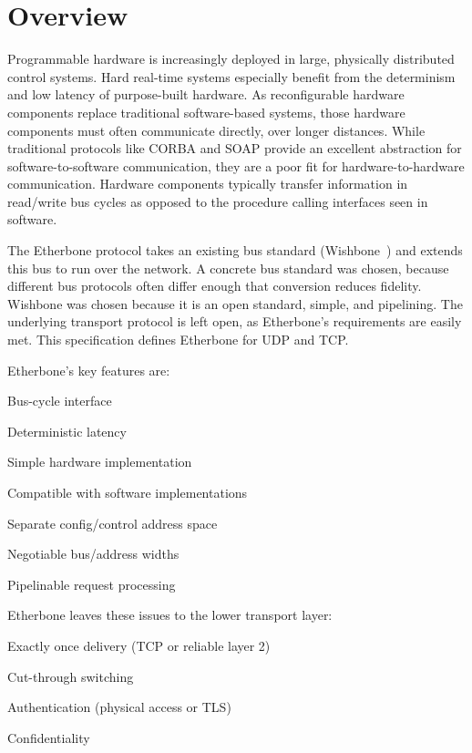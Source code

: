\documentclass{article}
\newenvironment{packed_itemize}{
\begin{itemize}
  \setlength{\itemsep}{1pt}
  \setlength{\parskip}{0pt}
  \setlength{\parsep}{0pt}
}{\end{itemize}}
\begin{document}

\section{Overview}

Programmable hardware is increasingly deployed in large, physically distributed control systems.
Hard real-time systems especially benefit from the determinism and low latency of purpose-built hardware.
As reconfigurable hardware components replace traditional software-based systems, 
those hardware components must often communicate directly, over longer distances.
While traditional protocols like CORBA and SOAP 
provide an excellent abstraction for software-to-software communication,
they are a poor fit for hardware-to-hardware communication.
Hardware components typically transfer information in read/write bus cycles
as opposed to the procedure calling interfaces seen in software.

The Etherbone protocol takes an existing bus standard (Wishbone~\cite{wishbone}) 
and extends this bus to run over the network.
A concrete bus standard was chosen, 
because different bus protocols often differ enough that conversion reduces fidelity.
Wishbone was chosen because it is an open standard, simple, and pipe\-lining.
The underlying transport protocol is left open,
as Etherbone's require\-ments are easily met.
This specification defines Etherbone for UDP and TCP.

Etherbone's key features are:
\begin{packed_itemize}
\item Bus-cycle interface
\item Deterministic latency
\item Simple hardware implementation
\item Compatible with software implementations
\item Separate config/control address space
\item Negotiable bus/address widths
\item Pipelinable request processing
\end{packed_itemize}

Etherbone leaves these issues to the lower transport layer:
\begin{packed_itemize}
\item Exactly once delivery (TCP or reliable layer 2)
\item Cut-through switching
\item Authentication (physical access or TLS)
\item Confidentiality
\end{packed_itemize}
\end{document}
